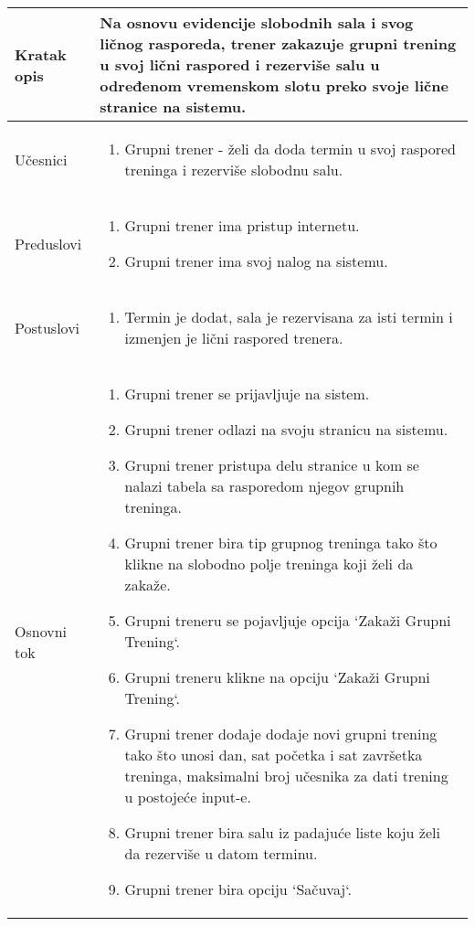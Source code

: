 \documentclass[../grupniTreninzi.tex]{subfiles}
\begin{document}
\begin{longtable}{| p{} | p{} |} 
\hline
    Kratak opis &  Na osnovu evidencije slobodnih sala i svog ličnog rasporeda, trener zakazuje grupni trening u svoj lični raspored i rezerviše salu u određenom vremenskom slotu preko svoje lične stranice na sistemu.\\ 
\hline    
    Učesnici &
    \begin{enumerate}
        \item Grupni trener - želi da doda termin u svoj raspored treninga i rezerviše slobodnu salu.
    \end{enumerate}\\
\hline
   Preduslovi & 
   \begin{enumerate}
        \item Grupni trener ima pristup internetu.
        \item Grupni trener ima svoj nalog na sistemu.
    \end{enumerate}\\
\hline  
    Postuslovi &
    \begin{enumerate}
        \item Termin je dodat, sala je rezervisana za isti termin i izmenjen je lični raspored trenera.
    \end{enumerate}\\
\hline
    Osnovni tok & 
    \begin{enumerate}
        \item Grupni trener se prijavljuje na sistem.
        \item Grupni trener odlazi na svoju stranicu na sistemu.
        \item Grupni trener pristupa delu stranice u kom se nalazi tabela sa rasporedom njegov grupnih treninga.
        \item Grupni trener bira tip grupnog treninga tako što klikne na slobodno polje treninga koji želi da zakaže.
        \item Grupni treneru se pojavljuje opcija `Zakaži Grupni Trening`.
        \item Grupni treneru klikne na opciju  `Zakaži Grupni Trening`. 
        \item Grupni trener dodaje dodaje novi grupni trening tako što unosi dan, sat početka i sat završetka treninga, maksimalni broj učesnika za dati trening u postojeće input-e.
        \item Grupni trener bira salu iz padajuće liste koju želi da rezerviše u datom terminu.
        \item Grupni trener bira opciju `Sačuvaj`.

\end{enumerate}
\end{longtable}
\end{document}
